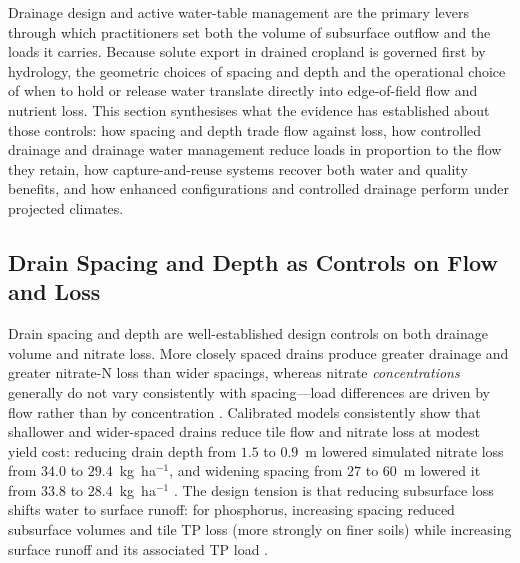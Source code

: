 Drainage design and active water-table management are the primary levers
through which practitioners set both the volume of subsurface outflow and the
loads it carries. Because solute export in drained cropland is governed first
by hydrology, the geometric choices of spacing and depth and the operational
choice of when to hold or release water translate directly into edge-of-field
flow and nutrient loss. This section synthesises what the evidence has
established about those controls: how spacing and depth trade flow against
loss, how controlled drainage and drainage water management reduce loads in
proportion to the flow they retain, how capture-and-reuse systems recover both
water and quality benefits, and how enhanced configurations and controlled
drainage perform under projected climates.

\subsection{Drain Spacing and Depth as Controls on Flow and Loss}

Drain spacing and depth are well-established design controls on both drainage
volume and nitrate loss. More closely spaced drains produce greater drainage
and greater nitrate-N loss than wider spacings, whereas nitrate
\emph{concentrations} generally do not vary consistently with spacing---load
differences are driven by flow rather than by concentration
\parencite{Kladivko2021,Kladivko2004}. Calibrated models consistently show that
shallower and wider-spaced drains reduce tile flow and nitrate loss at modest
yield cost: reducing drain depth from $1.5$ to $0.9$~m lowered simulated
nitrate loss from $34.0$ to $29.4$~kg~ha$^{-1}$, and widening spacing from $27$
to $60$~m lowered it from $33.8$ to $28.4$~kg~ha$^{-1}$
\parencite{Moriasi2013,Nangia2010c,Davis2000,Hwang2024}. The design tension is
that reducing subsurface loss shifts water to surface runoff: for phosphorus,
increasing spacing reduced subsurface volumes and tile TP loss (more strongly
on finer soils) while increasing surface runoff and its associated TP load
\parencite{Morrison2013}.

